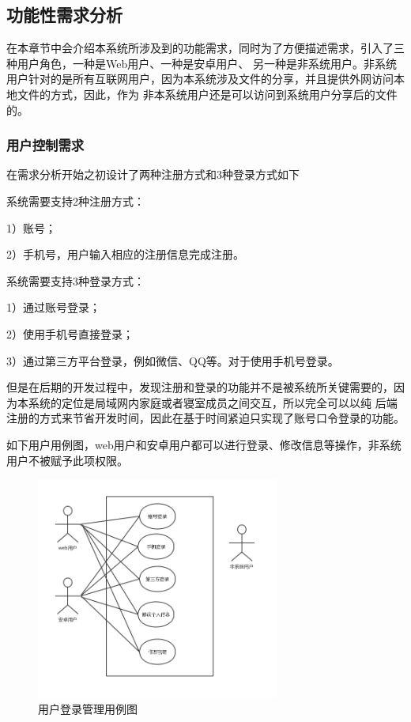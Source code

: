 \subsection{功能性需求分析}
在本章节中会介绍本系统所涉及到的功能需求，同时为了方便描述需求，引入了三种用户角色，一种是Web用户、一种是安卓用户、
另一种是非系统用户。非系统用户针对的是所有互联网用户，因为本系统涉及文件的分享，并且提供外网访问本地文件的方式，因此，作为
非本系统用户还是可以访问到系统用户分享后的文件的。

\subsubsection{用户控制需求}
在需求分析开始之初设计了两种注册方式和3种登录方式如下
\par 系统需要支持2种注册方式：
\par 1）账号；
\par 2）手机号，用户输入相应的注册信息完成注册。
\par 系统需要支持3种登录方式：
\par 1）通过账号登录；
\par 2）使用手机号直接登录；
\par 3）通过第三方平台登录，例如微信、QQ等。对于使用手机号登录。

但是在后期的开发过程中，发现注册和登录的功能并不是被系统所关键需要的，因为本系统的定位是局域网内家庭或者寝室成员之间交互，所以完全可以以纯
后端注册的方式来节省开发时间，因此在基于时间紧迫只实现了账号口令登录的功能。

如下用户用例图，web用户和安卓用户都可以进行登录、修改信息等操作，非系统用户不被赋予此项权限。
\begin{figure}[H]
  \centering
  \includegraphics[width=80mm]{./figures/login_yongli.png}
  \caption{用户登录管理用例图}
\end{figure}

